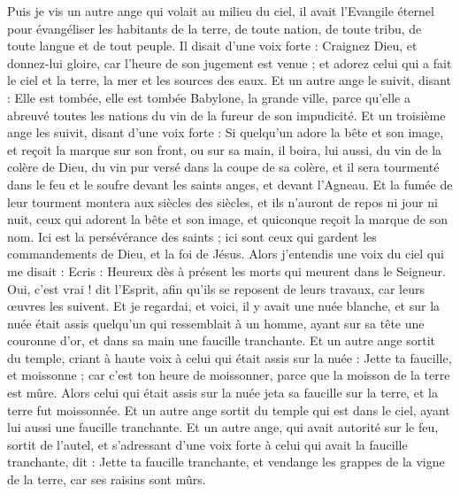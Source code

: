 \begin{multicols}{2}
Puis je vis un autre ange qui volait au milieu du ciel, il avait l'Evangile éternel pour évangéliser les habitants de la terre, de toute nation, de toute tribu, de toute langue et de tout peuple.
Il disait d’une voix forte : Craignez Dieu, et donnez-lui gloire, car l'heure de son jugement est venue ; et adorez celui qui a fait le ciel et la terre, la mer et les sources des eaux.
Et un autre ange le suivit, disant : Elle est tombée, elle est tombée Babylone, la grande ville, parce qu'elle a abreuvé toutes les nations du vin de la fureur de son impudicité.
Et un troisième ange les suivit, disant d’une voix forte : Si quelqu'un adore la bête et son image, et reçoit la marque sur son front, ou sur sa main,
il boira, lui aussi, du vin de la colère de Dieu, du vin pur versé dans la coupe de sa colère, et il sera tourmenté dans le feu et le soufre devant les saints anges, et devant l'Agneau.
Et la fumée de leur tourment montera aux siècles des siècles, et ils n'auront de repos ni jour ni nuit, ceux qui adorent la bête et son image, et quiconque reçoit la marque de son nom.
Ici est la persévérance des saints ; ici sont ceux qui gardent les commandements de Dieu, et la foi de Jésus.
Alors j'entendis une voix du ciel qui me disait : Ecris : Heureux dès à présent les morts qui meurent dans le Seigneur. Oui, c’est vrai ! dit l'Esprit, afin qu’ils se reposent de leurs travaux, car leurs œuvres les suivent.
Et je regardai, et voici, il y avait une nuée blanche, et sur la nuée était assis quelqu'un qui ressemblait à un homme{}, ayant sur sa tête une couronne d'or, et dans sa main une faucille tranchante.
Et un autre ange sortit du temple, criant à haute voix à celui qui était assis sur la nuée : Jette ta faucille, et moissonne ; car c'est ton heure de moissonner, parce que la moisson de la terre est mûre{}.
Alors celui qui était assis sur la nuée jeta sa faucille sur la terre, et la terre fut moissonnée.
Et un autre ange sortit du temple qui est dans le ciel, ayant lui aussi une faucille tranchante.
Et un autre ange, qui avait autorité sur le feu, sortit de l'autel, et s’adressant d’une voix forte à celui qui avait la faucille tranchante, dit : Jette ta faucille tranchante, et vendange les grappes de la vigne de la terre, car ses raisins sont mûrs.

\end{multicols}
